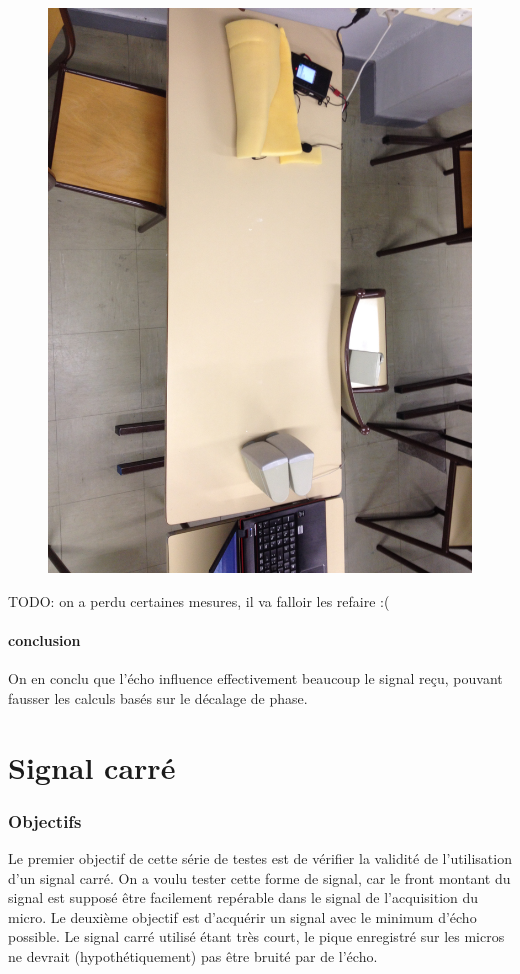 \documentclass[12pt,a4paper]{report}
\begin{document}
\begin{figure}[H]
\includegraphics[width=\textwidth]{../donnees25-02/IMG_0924.jpg} 
\end{figure}

TODO: on a perdu certaines mesures, il va falloir les refaire :(

\subsection{conclusion}
On en conclu que l'écho influence effectivement beaucoup le signal reçu, pouvant fausser les calculs basés sur le décalage de phase.

\part{Signal carré}
\section{Objectifs}
	Le premier objectif de cette série de testes est de vérifier la validité de l'utilisation d'un signal carré.
	On a voulu tester cette forme de signal, car le front montant du signal est supposé être facilement repérable dans le signal de l'acquisition du micro.
	Le deuxième objectif est d'acquérir un signal avec le minimum d'écho possible. Le signal carré utilisé étant très court, le pique enregistré sur les micros ne devrait (hypothétiquement) pas être bruité par de l'écho.
\end{document}
